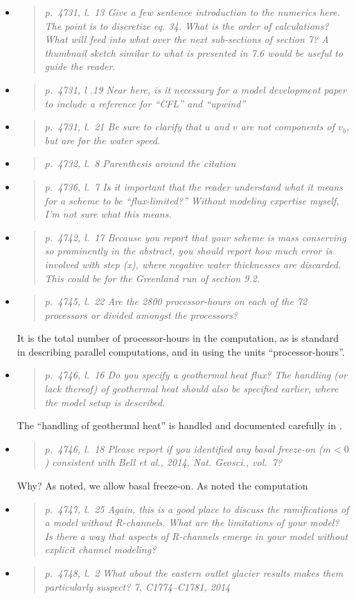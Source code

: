 \documentclass[11pt,reqno]{amsart}
\newcommand{\reply}[2]{
\medskip\medskip
\item  \begin{quote}
\emph{#1}
\end{quote}

\medskip
\noindent #2}
\begin{document}
\begin{itemize}
\reply{p.~4731, l.~13 Give a few sentence introduction to the numerics here. The point is to
discretize eq. 34. What is the order of calculations? What will feed into what over the
next sub-sections of section 7? A thumbnail sketch similar to what is presented in 7.6
would be useful to guide the reader.}
{}

\reply{p.~4731, l .19 Near here, is it necessary for a model development paper to include a
reference for ``CFL'' and ``upwind''}
{}

\reply{p.~4731, l.~21 Be sure to clarify that $u$ and $v$ are not components of $v_b$, but are for the water speed.}
{}

\reply{p.~4732, l.~8 Parenthesis around the citation}
{}

\reply{p.~4736, l.~7 Is it important that the reader understand what it means for a scheme to be ``flux-limited?''  Without modeling expertise myself, I’m not sure what this means.}
{}

\reply{p.~4742, l.~17 Because you report that your scheme is mass conserving so prominently
in the abstract, you should report how much error is involved with step (x), where
negative water thicknesses are discarded. This could be for the Greenland run of
section 9.2.}
{}

\reply{p.~4745, l.~22 Are the 2800 processor-hours on each of the 72 processors or divided amongst the processors?}
{It is the total number of processor-hours in the computation, as is standard in describing parallel computations, and in using the units ``processor-hours''.}

\reply{p.~4746, l.~16 Do you specify a geothermal heat flux? The handling (or lack thereof) of geothermal heat should also be specified earlier, where the model setup is described.}
{The ``handling of geothermal heat'' is handled and documented carefully in \cite{}.}

\reply{p.~4746, l.~18 Please report if you identified any basal freeze-on ($m < 0$) consistent with Bell et al., 2014, Nat. Geosci., vol.~7?}
{Why?  As noted, we allow basal freeze-on.  As noted the computation }

\reply{p.~4747, l.~25 Again, this is a good place to discuss the ramifications of a model without
R-channels. What are the limitations of your model? Is there a way that aspects of R-channels emerge in your model without explicit channel modeling?}
{}

\reply{p.~4748, l.~2 What about the eastern outlet glacier results makes them particularly
suspect? 7, C1774--C1781, 2014}
{}


\end{itemize}
\end{document}
